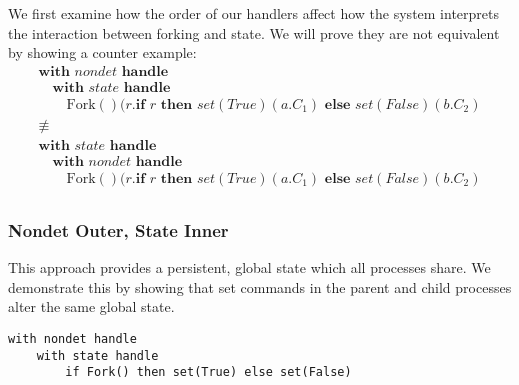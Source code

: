 \documentclass[logo,bsc,singlespacing,parskip]{infthesis}
\begin{document}
We first examine how the order of our handlers affect how the system interprets the interaction between forking and state. We will prove they are not equivalent by showing a counter example:
\[
\begin{array}{l}
\textbf{with } \mathit{nondet} \textbf{ handle } \\
\quad \textbf{with } \mathit{state} \textbf{ handle } \\
\quad\quad \text{Fork}()(r. \textbf{if } r \textbf{ then } set(True)(a.C_1) \textbf{ else } set(False)(b.C_2) \\[5pt]
\not\equiv\quad  \\
\textbf{with } \mathit{state} \textbf{ handle } \\
\quad \textbf{with } \mathit{nondet} \textbf{ handle } \\
\quad\quad \text{Fork}()(r. \textbf{if } r \textbf{ then } set(True)(a.C_1) \textbf{ else } set(False)(b.C_2) \\[5pt]
\end{array}
\]

\subsubsection*{Nondet Outer, State Inner}
This approach provides a persistent, global state which all processes share. We demonstrate this by showing that set commands in the parent and child processes alter the same global state.



\begin{lstlisting}
with nondet handle
    with state handle
        if Fork() then set(True) else set(False)
\end{lstlisting}
\end{document}
